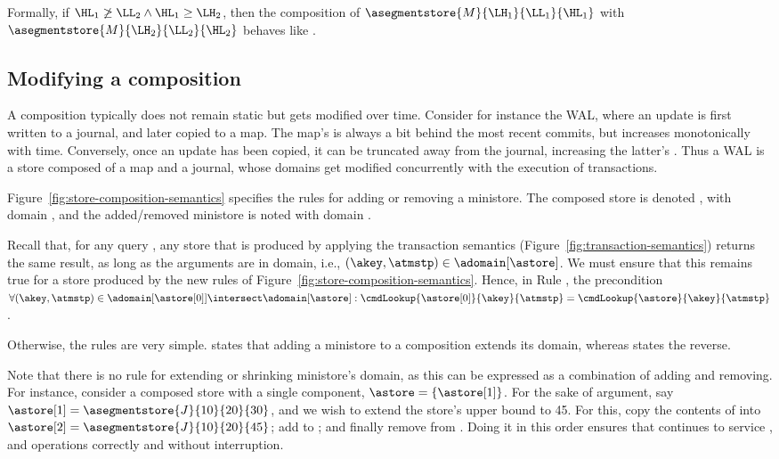 Formally, if $\HL_{1} \not\ge \LL_{2} \land \HL_{1} \ge
\LH_{2}$, then the composition of
$\asegmentstore{M}{\LH_{1}}{\LL_{1}}{\HL_{1}}$ with
$\asegmentstore{M}{\LH_{2}}{\LL_{2}}{\HL_{2}}$ behaves like
.

\subsection{Modifying a composition}
\label{sec:modify-composition}

A composition typically does not remain static but gets modified over
time.
Consider for instance the WAL, where an update is first written to a
journal, and later copied to a map.
The map's \highlookup{} is always a bit behind the most
recent commits, but increases monotonically with time.
Conversely, once an update has been copied, it can be truncated away
from the journal, increasing the latter's \lowlookup{}.
Thus a WAL is a store composed of a map and a journal, whose domains get
modified concurrently with the execution of transactions.

Figure~\ref{fig:store-composition-semantics} specifies the rules for
adding or removing a ministore.
The composed store is denoted \astore{}, with domain \adomain[\astore],
and the added{\slash}removed ministore is noted \astore[0] with domain
\adomain[{\astore[0]}].

Recall that, for any query \cmdLookup{\astore{}}{\akey{}}{\atmstp{}},
any store \astore{} that is produced by applying the transaction semantics
(Figure~\ref{fig:transaction-semantics}) returns the same result, as
long as the arguments are in domain, i.e., $(\akey, \atmstp) \in
\adomain[\astore]$.
We must ensure that this remains true for a store produced by the new
rules of Figure~\ref{fig:store-composition-semantics}.
Hence, in Rule \addminirule{}, the precondition $\forall (\akey,\atmstp)
\in \adomain[{\astore[0]}] \intersect \adomain[\astore]:
\cmdLookup{\astore[0]}{\akey}{\atmstp} =
\cmdLookup{\astore}{\akey}{\atmstp}$.

Otherwise, the rules are very simple.
\addminirule{} states that adding a ministore to a composition extends
its domain, whereas \rmvminirule{} states the reverse.

Note that there is no rule for extending or shrinking ministore's
domain, as this can be expressed as a combination of adding and
removing.
For instance, consider a composed store with a single component,
$\astore = \{ \astore[1] \}$.
For the sake of argument, say
$\astore[1]=\asegmentstore{J}{10}{20}{30}$, and we wish to extend the
store's upper bound to 45.
For this, copy the contents of \astore[1] into
$\astore[2]=\asegmentstore{J}{10}{20}{45}$; add \astore[2] to \astore{};
and finally remove \astore[1] from \astore{}.
Doing it in this order ensures that \astore{} continues to service
\lookup{}, \doUpdate{} and \doCommit{} operations correctly and without
interruption.

